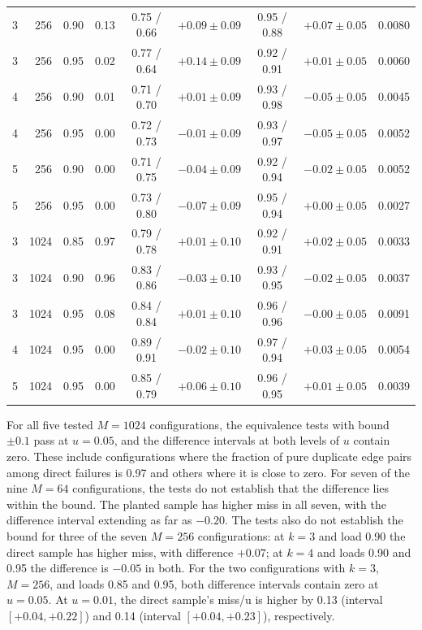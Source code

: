 \begin{table}[!htbp]
\begin{tabular}{@{}rrrrcccc r@{}}
3 & 256 & 0.90 & 0.13 & 0.75 / 0.66 & $+0.09\pm0.09$ & 0.95 / 0.88 & $+0.07\pm0.05$ & 0.0080\\
3 & 256 & 0.95 & 0.02 & 0.77 / 0.64 & $+0.14\pm0.09$ & 0.92 / 0.91 & $+0.01\pm0.05$ & 0.0060\\
4 & 256 & 0.90 & 0.01 & 0.71 / 0.70 & $+0.01\pm0.09$ & 0.93 / 0.98 & $-0.05\pm0.05$ & 0.0045\\
4 & 256 & 0.95 & 0.00 & 0.72 / 0.73 & $-0.01\pm0.09$ & 0.93 / 0.97 & $-0.05\pm0.05$ & 0.0052\\
5 & 256 & 0.90 & 0.00 & 0.71 / 0.75 & $-0.04\pm0.09$ & 0.92 / 0.94 & $-0.02\pm0.05$ & 0.0052\\
5 & 256 & 0.95 & 0.00 & 0.73 / 0.80 & $-0.07\pm0.09$ & 0.95 / 0.94 & $+0.00\pm0.05$ & 0.0027\\
3 & 1024 & 0.85 & 0.97 & 0.79 / 0.78 & $+0.01\pm0.10$ & 0.92 / 0.91 & $+0.02\pm0.05$ & 0.0033\\
3 & 1024 & 0.90 & 0.96 & 0.83 / 0.86 & $-0.03\pm0.10$ & 0.93 / 0.95 & $-0.02\pm0.05$ & 0.0037\\
3 & 1024 & 0.95 & 0.08 & 0.84 / 0.84 & $+0.01\pm0.10$ & 0.96 / 0.96 & $-0.00\pm0.05$ & 0.0091\\
4 & 1024 & 0.95 & 0.00 & 0.89 / 0.91 & $-0.02\pm0.10$ & 0.97 / 0.94 & $+0.03\pm0.05$ & 0.0054\\
5 & 1024 & 0.95 & 0.00 & 0.85 / 0.79 & $+0.06\pm0.10$ & 0.96 / 0.95 & $+0.01\pm0.05$ & 0.0039\\
\bottomrule
\end{tabular}
\end{table}

For all five tested $M=1024$ configurations, the equivalence tests with bound $\pm0.1$ pass at $u=0.05$, and the difference intervals at both levels of $u$ contain zero. These include configurations where the fraction of pure duplicate edge pairs among direct failures is 0.97 and others where it is close to zero. For seven of the nine $M=64$ configurations, the tests do not establish that the difference lies within the bound. The planted sample has higher miss in all seven, with the difference interval extending as far as $-0.20$. The tests also do not establish the bound for three of the seven $M=256$ configurations: at $k=3$ and load 0.90 the direct sample has higher miss, with difference $+0.07$; at $k=4$ and loads 0.90 and 0.95 the difference is $-0.05$ in both. For the two configurations with $k=3$, $M=256$, and loads 0.85 and 0.95, both difference intervals contain zero at $u=0.05$. At $u=0.01$, the direct sample's miss/u is higher by 0.13 (interval $[+0.04,+0.22]$) and 0.14 (interval $[+0.04,+0.23]$), respectively.

